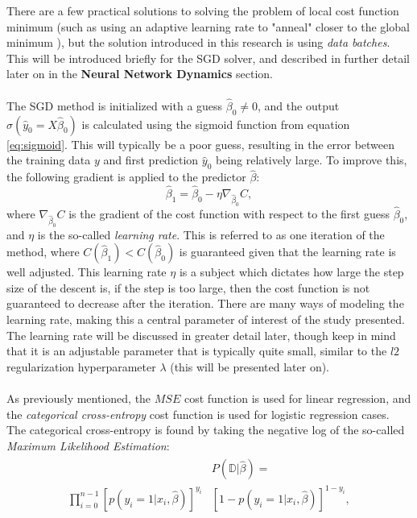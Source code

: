             There are a few practical solutions to solving the problem of local cost function minimum (such as using an adaptive learning rate to "anneal" closer to the global minimum \cite{stackexchangeminimum}), but the solution introduced in this research is using \textit{data batches}. This will be introduced briefly for the SGD solver, and described in further detail later on in the \textbf{Neural Network Dynamics} section.\\\\
            The SGD method is initialized with a guess $\hat{\beta}_0 \neq 0$, and the output $\sigma(\hat{y}_0=X\hat{\beta}_0)$ is calculated using the sigmoid function from equation \ref{eq:sigmoid}. This will typically be a poor guess, resulting in the error between the training data $y$ and first prediction $\hat{y}_0$ being relatively large. To improve this, the following gradient is applied to the predictor $\hat{\beta}$:
            \begin{equation}
                \hat{\beta}_1 = \hat{\beta}_0 - \eta \nabla_{\hat{\beta}_0}C,
            \end{equation}
            where $\nabla_{\hat{\beta}_0}C$ is the gradient of the cost function with respect to the first guess $\hat{\beta}_0$, and $\eta$ is the so-called \textit{learning rate}. This is referred to as one iteration of the method, where $C(\hat{\beta}_1) < C(\hat{\beta}_0)$ is guaranteed given that the learning rate is well adjusted. This learning rate $\eta$ is a subject which dictates how large the step size of the descent is, if the step is too large, then the cost function is not guaranteed to decrease after the iteration. There are many ways of modeling the learning rate, making this a central parameter of interest of the study presented. The learning rate will be discussed in greater detail later, though keep in mind that it is an adjustable parameter that is typically quite small, similar to the $l2$ regularization hyperparameter $\lambda$ (this will be presented later on).
            \\\\
            As previously mentioned, the $MSE$ cost function is used for linear regression, and the \textit{categorical cross-entropy} cost function is used for logistic regression
            cases. The categorical cross-entropy is found by taking the negative log of the so-called \textit{Maximum Likelihood Estimation}:
            \begin{align}
                \begin{split}
                    &P(\mathds{D}|\hat{\beta}) =\\ \prod^{n-1}_{i=0} \left[ p(y_i=1|x_i, \hat{\beta}) \right]^{y_i}&\left[ 1-p(y_i=1|x_i, \hat{\beta}) \right]^{1-y_i},
                \end{split}
            \end{align}
